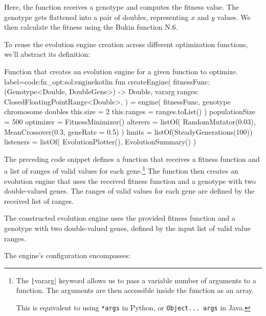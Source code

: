     Here, the function receives a genotype and computes the fitness value. The genotype gets flattened into a pair of doubles, representing \(x\) and \(y\) values. We then calculate the fitness using the Bukin function N.6.

    To reuse the evolution engine creation across different optimization functions, we'll abstract its definition:

    \begin{code}{
      Function that creates an evolution engine for a given function to optimize.
    }{label=code:fn_opt:sol:engine}{kotlin}
      fun createEngine(
          fitnessFunc: (Genotype<Double, DoubleGene>) -> Double,
          vararg ranges: ClosedFloatingPointRange<Double>,
      ) = engine(
          fitnessFunc,
          genotype {
              chromosome {
                  doubles {
                      this.size = 2
                      this.ranges = ranges.toList()
                  }
              }
          }
      ) {
          populationSize = 500
          optimizer = FitnessMinimizer()
          alterers = listOf(
              RandomMutator(0.03),
              MeanCrossover(0.3, geneRate = 0.5)
          )
          limits = listOf(SteadyGenerations(100))
          listeners = listOf(
              EvolutionPlotter(),
              EvolutionSummary()
          )
      }
    \end{code}

    The preceding code snippet defines a function that receives a fitness
    function and a list of ranges of valid values for each gene.\footnote{
      The \texttt|vararg| keyword allows us to pass a variable
      number of arguments to a function. The arguments are then accessible
      inside the function as an array.

      This is equivalent to using \texttt{*args} in Python, or
      \texttt{Object... args} in Java. 
    } The function then creates an evolution engine that uses the received
    fitness function and a genotype with two double-valued genes. The ranges
    of valid values for each gene are defined by the received list of ranges.
    
    The constructed evolution engine uses the provided fitness function and a genotype with two double-valued genes, defined by the input list of valid value ranges.

    The engine's configuration encompasses:

